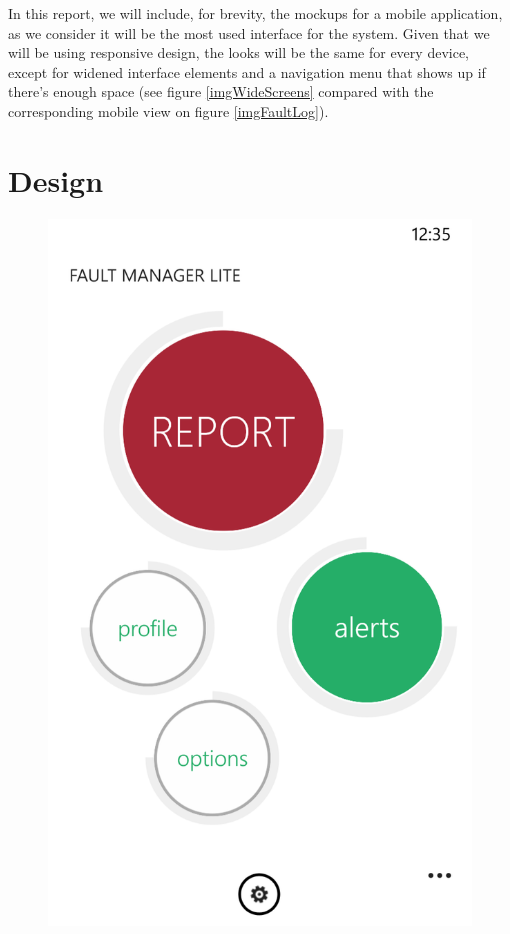 \documentclass{report}
\begin{document}
In this report, we will include, for brevity, the mockups for a mobile application, as we consider it will be the most used interface for the system. Given that we will be using responsive design, the looks will be the same for every device, except for widened interface elements and a navigation menu that shows up if there's enough space (see figure \ref{imgWideScreens} compared with the corresponding mobile view on figure  \ref{imgFaultLog}).

\section{Design}

\begin{figure}[hbtp]
\centering
\begin{minipage}{0.3\textwidth}
\includegraphics[width=\textwidth]{img/MainPage.png}

\end{minipage}
\end{figure}
\end{document}
